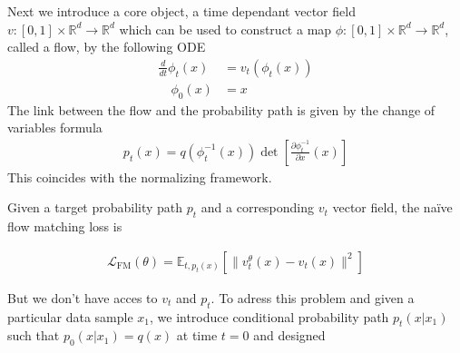 \documentclass[a4paper,12pt]{article}
\begin{document}
\newpage

Next we introduce a core object, a time dependant vector field \(v:[0,1]\times \mathbb{R}^d\rightarrow\mathbb{R}^d\) which can be used to construct a map \(\phi:[0,1]\times\mathbb{R}^d\rightarrow\mathbb{R}^d\), called a flow, by the following ODE
\begin{align}
    \frac{d}{dt}\phi_t(x)&=v_t(\phi_t(x))\\
    \quad \phi_0(x)&=x \nonumber
\end{align}  
The link between the flow and the probability path is given by the change of variables formula 
\begin{align}
    p_t(x)=q(\phi_t^{-1}(x))\det \left[\frac{\partial\phi_t^{-1}}{\partial x}(x)\right]
\end{align}
This coincides with the normalizing framework.

\bigskip

Given a target probability path \(p_t\) and a corresponding \(v_t\) vector field, the naïve flow matching loss is 

\begin{align}
    \mathcal{L}_\text{FM}(\theta) = \mathbb{E}_{t,p_t(x)}[\|v_t^\theta(x)-v_t(x)\|^2]
\end{align}

But we don't have acces to \(v_t\) and \(p_t\). To adress this problem and given a particular data sample \(x_1\), we introduce conditional probability path \(p_t(x|x_1)\) such that \(p_0(x|x_1)=q(x)\) at time \(t=0\) and designed  




\end{document}
